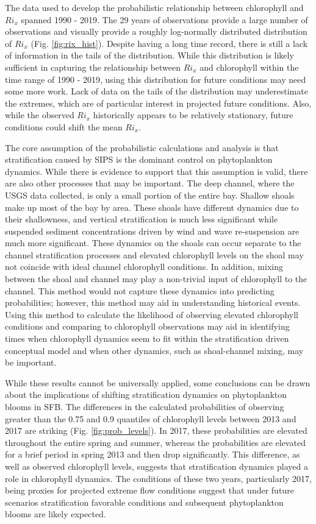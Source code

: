 \documentclass[preprint,review,12pt]{elsarticle}
\begin{document}
The data used to develop the probabilistic relationship between chlorophyll and \(Ri_x\) spanned 1990 - 2019. The 29 years of observations provide a large number of observations and visually provide a roughly log-normally distributed distribution of \(Ri_x\) (Fig. \ref{fig:rix_hist}). Despite having a long time record, there is still a lack of information in the tails of the distribution. While this distribution is likely sufficient in capturing the relationship between \(Ri_x\) and chlorophyll within the time range of 1990 - 2019, using this distribution for future conditions may need some more work. Lack of data on the tails of the distribution may underestimate the extremes, which are of particular interest in projected future conditions. Also, while the observed \(Ri_x\) historically appears to be relatively stationary, future conditions could shift the mean \(Ri_x\). 

The core assumption of the probabilistic calculations and analysis is that stratification caused by SIPS is the dominant control on phytoplankton dynamics. While there is evidence to support that this assumption is valid, there are also other processes that may be important. The deep channel, where the USGS data collected, is only a small portion of the entire bay. Shallow shoals make up most of the bay by area. These shoals have different dynamics due to their shallowness, and vertical stratification is much less significant while suspended sediment concentrations driven by wind and wave re-suspension are much more significant. These dynamics on the shoals can occur separate to the channel stratification processes and elevated chlorophyll levels on the shoal may not coincide with ideal channel chlorophyll conditions. In addition, mixing between the shoal and channel may play a non-trivial input of chlorophyll to the channel. This method would not capture these dynamics into predicting probabilities; however, this method may aid in understanding historical events. Using this method to calculate the likelihood of observing elevated chlorophyll conditions and comparing to chlorophyll observations may aid in identifying times when chlorophyll dynamics seem to fit within the stratification driven conceptual model and when other dynamics, such as shoal-channel mixing, may be important.   

While these results cannot be universally applied, some conclusions can be drawn about the implications of shifting stratification dynamics on phytoplankton blooms in SFB. The differences in the calculated probabilities of observing greater than the 0.75 and 0.9 quantiles of chlorophyll levels between 2013 and 2017 are striking (Fig. \ref{fig:prob_levels}). In 2017, these probabilities are elevated throughout the entire spring and summer, whereas the probabilities are elevated for a brief period in spring 2013 and then drop significantly. This difference, as well as observed chlorophyll levels, suggests that stratification dynamics played a role in chlorophyll dynamics. The conditions of these two years, particularly 2017, being proxies for projected extreme flow conditions suggest that under future scenarios stratification favorable conditions and subsequent phytoplankton blooms are likely expected.  
\end{document}
